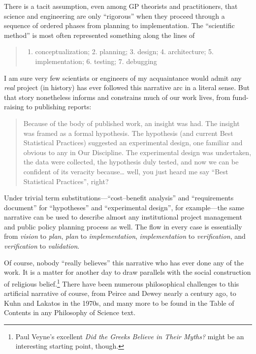 There is a tacit assumption, even among GP theorists and practitioners, that science and engineering are only ``rigorous'' when they proceed through a sequence of ordered phases from planning to implementation. The ``scientific method'' is most often represented something along the lines of

\begin{quote}
\begin{enumerate}
\item conceptualization; 2. planning; 3. design; 4. architecture; 5. implementation; 6. testing; 7. debugging
\end{enumerate}
\end{quote}

I am sure very few scientists or engineers of my acquaintance would admit any \emph{real} project (in history) has ever followed this narrative arc in a literal sense. But that story nonetheless informs and constrains much of our work lives, from fund-raising to publishing reports:

\begin{quote}
Because of the body of published work, an insight was had. The insight was framed as a formal hypothesis. The hypothesis (and current Best Statistical Practices) suggested an experimental design, one familiar and obvious to any in Our Discipline. The experimental design was undertaken, the data were collected, the hypothesis duly tested, and now we can be confident of its veracity because\ldots{} well, you just heard me say ``Best Statistical Practices'', right?
\end{quote}

Under trivial term substitutions---``cost--benefit analysis'' and ``requirements document'' for ``hypotheses'' and ``experimental design'', for example---the same narrative can be used to describe almost any institutional project management and public policy planning process as well. The flow in every case is essentially from \emph{vision} to \emph{plan}, \emph{plan} to \emph{implementation}, \emph{implementation} to \emph{verification}, and \emph{verification} to \emph{validation}.

Of course, nobody ``really believes'' this narrative who has ever done any of the work. It is a matter for another day to draw parallels with the social construction of religious belief.\footnote{Paul Veyne's excellent \emph{Did the Greeks Believe in Their Myths?} might be an interesting starting point, though.} There have been numerous philosophical challenges to this artificial narrative of course, from Peirce and Dewey nearly a century ago, to Kuhn and Lakatos in the 1970s, and many more to be found in the Table of Contents in any Philosophy of Science text.

